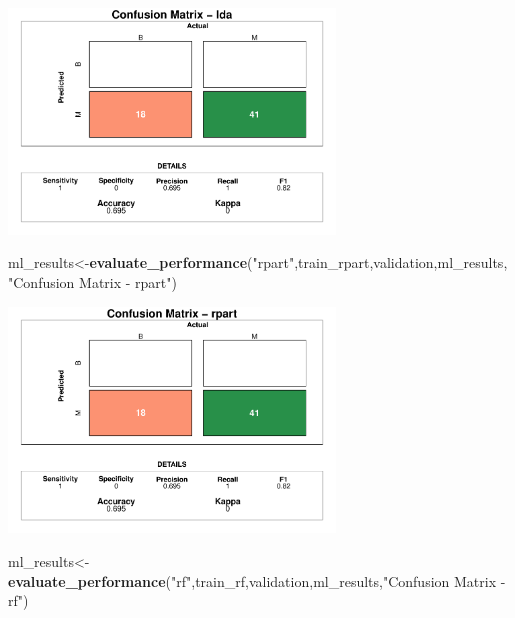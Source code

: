 \documentclass[]{article}
\newenvironment{Shaded}{\begin{snugshade}}{\end{snugshade}}
\newcommand{\KeywordTok}[1]{\textcolor[rgb]{0.13,0.29,0.53}{\textbf{#1}}}
\newcommand{\NormalTok}[1]{#1}
\newcommand{\StringTok}[1]{\textcolor[rgb]{0.31,0.60,0.02}{#1}}
\begin{document}
\begin{center}
\includegraphics[width=0.65\textwidth]{LiverDisease_files/figure-latex/unnamed-chunk-43-1.pdf}
\end{center}

\begin{Shaded}
\begin{Highlighting}[]
\NormalTok{ml_results<-}\KeywordTok{evaluate_performance}\NormalTok{(}\StringTok{"rpart"}\NormalTok{,train_rpart,validation,ml_results, }\StringTok{"Confusion Matrix - rpart"}\NormalTok{)}
\end{Highlighting}
\end{Shaded}

\begin{center}
\includegraphics[width=0.65\textwidth]{LiverDisease_files/figure-latex/unnamed-chunk-44-1.pdf}
\end{center}

\begin{Shaded}
\begin{Highlighting}[]
\NormalTok{ml_results<-}\KeywordTok{evaluate_performance}\NormalTok{(}\StringTok{"rf"}\NormalTok{,train_rf,validation,ml_results,}\StringTok{"Confusion Matrix - rf"}\NormalTok{)}
\end{Highlighting}
\end{Shaded}
\end{document}
